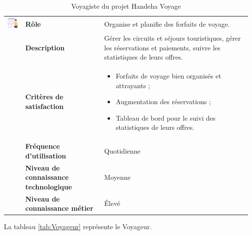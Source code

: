 \documentclass[12pt]{report}
\begin{document}
				\begin{longtable}{|p{3cm}|p{4cm}|p{7cm}|}
				  \caption{Voyagiste du projet Handeha Voyage}
				  \label{tab:Voyagiste}\\
				  \hline
				\endfirsthead
				\hline
				\endhead
				\begin{minipage}{3cm}
					\includegraphics[width=2cm]{voyagiste.png}
				\end{minipage} & \textbf{Rôle} & Organise et planifie des forfaits de voyage.\\ \cline{2-3}
						& \textbf{Description} & Gérer les circuits et séjours touristiques, gérer les réservations et paiements, suivre les statistiques de leurs offres. \\ \cline{2-3}
						& \textbf{Critères de satisfaction} & \begin{itemize}
																\item Forfaits de voyage bien organisés et attrayants ;
																\item Augmentation des réservations ;
																\item Tableau de bord pour le suivi des statistiques de leurs offres.
															\end{itemize}\\ \cline{2-3}
						& \textbf{Fréquence d’utilisation} & Quotidienne \\ \cline{2-3}
						& \textbf{Niveau de connaissance technologique} & Moyenne \\ \cline{2-3}
						& \textbf{Niveau de connaissance métier} & Élevé \\ 
				\hline
				\end{longtable}
				\FloatBarrier


				La tableau \ref{tab:Voyageur} représente le Voyageur.
\end{document}
